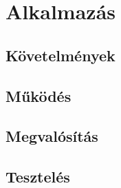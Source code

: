 \chapter{Alkalmazás}

\section{Követelmények}

\section{Működés}

\section{Megvalósítás}

\section{Tesztelés}